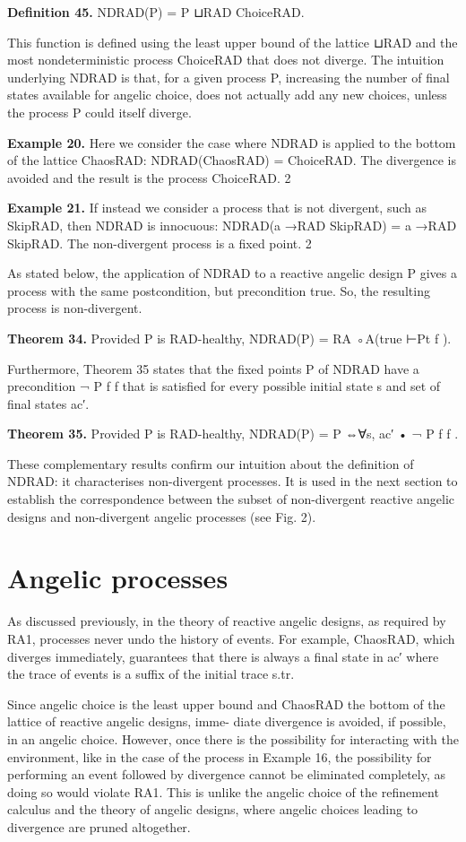 \documentclass[11pt]{article}
\begin{document}
\noindent\textbf{Definition 45.} NDRAD(P) = P ⊔RAD ChoiceRAD.


This function is defined using the least upper bound of the lattice ⊔RAD and the most nondeterministic process ChoiceRAD that does not diverge. The intuition underlying NDRAD is that, for a given process P, increasing the number of final states available for angelic choice, does not actually add any new choices, unless the process P could itself diverge.

\noindent\textbf{Example 20.} Here we consider the case where NDRAD is applied to the bottom of the lattice ChaosRAD: NDRAD(ChaosRAD) = ChoiceRAD. The divergence is avoided and the result is the process ChoiceRAD. 2


\noindent\textbf{Example 21.} If instead we consider a process that is not divergent, such as SkipRAD, then NDRAD is innocuous: NDRAD(a →RAD SkipRAD) = a →RAD SkipRAD. The non-divergent process is a fixed point. 2


As stated below, the application of NDRAD to a reactive angelic design P gives a process with the same postcondition, but precondition true. So, the resulting process is non-divergent.

\noindent\textbf{Theorem 34.} Provided P is RAD-healthy, NDRAD(P) = RA ◦A(true ⊢Pt f ).


Furthermore, Theorem 35 states that the fixed points P of NDRAD have a precondition ¬ P f f that is satisfied for every possible initial state s and set of final states ac′.

\noindent\textbf{Theorem 35.} Provided P is RAD-healthy, NDRAD(P) = P ⇔∀s, ac′ • ¬ P f f .


These complementary results confirm our intuition about the definition of NDRAD: it characterises non-divergent processes. It is used in the next section to establish the correspondence between the subset of non-divergent reactive angelic designs and non-divergent angelic processes (see Fig. 2).

\section{Angelic processes}
As discussed previously, in the theory of reactive angelic designs, as required by RA1, processes never undo the history of events. For example, ChaosRAD, which diverges immediately, guarantees that there is always a final state in ac′ where the trace of events is a suffix of the initial trace s.tr.

Since angelic choice is the least upper bound and ChaosRAD the bottom of the lattice of reactive angelic designs, imme- diate divergence is avoided, if possible, in an angelic choice. However, once there is the possibility for interacting with the environment, like in the case of the process in Example 16, the possibility for performing an event followed by divergence cannot be eliminated completely, as doing so would violate RA1. This is unlike the angelic choice of the refinement calculus and the theory of angelic designs, where angelic choices leading to divergence are pruned altogether.
\end{document}

